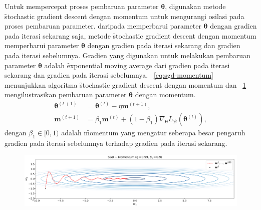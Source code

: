 Untuk mempercepat proses pembaruan parameter $\bm{\theta}$, digunakan metode \f{stochastic gradient descent} dengan momentum untuk mengurangi osilasi pada proses pembaruan parameter. daripada memperbarui parameter $\bm{\theta}$ dengan gradien pada iterasi sekarang saja, metode \f{stochastic gradient descent} dengan momentum memperbarui parameter $\bm{\theta}$ dengan gradien pada iterasi sekarang dan gradien pada iterasi sebelumnya. Gradien yang digunakan untuk melakukan pembaruan parameter $\bm{\theta}$ adalah \f{exponential moving average} dari gradien pada iterasi sekarang dan gradien pada iterasi sebelumnya. \equ~\ref{eq:sgd-momentum} menunjukkan algoritma \f{stochastic gradient descent} dengan momentum dan \pic~\ref{fig:sgd-momentum} mengilustrasikan pembaruan parameter $\bm{\theta}$ dengan momentum.
\begin{align}
    \label{eq:sgd-momentum}
    \bm{\theta}^{(t+1)} &= \bm{\theta}^{(t)} - \eta \mathbf{m}^{(t+1)}, \\
    \mathbf{m}^{(t+1)} &= \beta_1 \mathbf{m}^{(t)} + (1 - \beta_1) \nabla_{\bm{\theta}} L_{\mathcal{B}}(\bm{\theta}^{(t)}),
\end{align}
dengan $\beta_1 \in [0, 1)$ adalah \f{momentum} yang mengatur seberapa besar pengaruh gradien pada iterasi sebelumnya terhadap gradien pada iterasi sekarang.
\begin{figure}
    \centering
    \includegraphics[width=1\textwidth]{assets/pics/sgd-momentum.png}
    \label{fig:sgd-momentum}
\end{figure}

